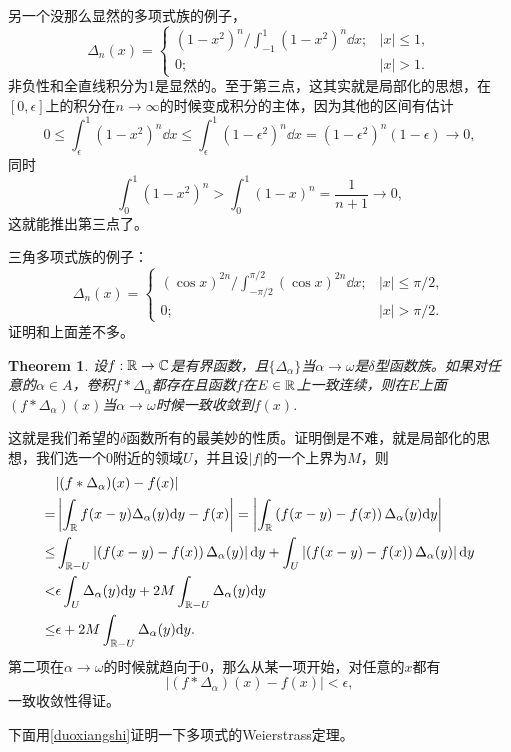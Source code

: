 \documentclass[10pt]{book}
\theoremstyle{plain}%
\newtheorem{theo}{Theorem}[chapter]%
\newcommand{\cc}{\mathbb{C}}
\begin{document}
另一个没那么显然的多项式族的例子，
\begin{equation}
\label{duoxiangshi}
	\Delta_n(x)=
	\begin{cases}
		\displaystyle{(1-x^2)^n\bigg/\int_{-1}^1(1-x^2)^n\dd x};&|x|\leq 1,\\
		0;&|x|> 1.
	\end{cases}
\end{equation}
非负性和全直线积分为1是显然的。至于第三点，这其实就是局部化的思想，在$[0,\epsilon]$上的积分在$n\to \infty$的时候变成积分的主体，因为其他的区间有估计
\[
0\leq \int_\epsilon^1 (1-x^2)^n\dd x\leq \int_\epsilon^1 (1-\epsilon^2)^n\dd x=(1-\epsilon^2)^n(1-\epsilon)\to 0,
\]
同时
\[
\int_0^1 (1-x^2)^n>\int_0^1 (1-x)^n=\frac{1}{n+1}\to 0,
\]
这就能推出第三点了。

三角多项式族的例子：
\[
	\Delta_n(x)=
	\begin{cases}
		\displaystyle{(\cos x)^{2n}\bigg/\int_{-\pi/2}^{\pi/2}(\cos x)^{2n}\dd x};&|x|\leq \pi/2,\\
		0;&|x|> \pi/2.
	\end{cases}
\]
证明和上面差不多。
\begin{theo}
设$f:\rr\to\cc$是有界函数，且$\{\Delta_\alpha\}$当$\alpha\to\omega$是$\delta$型函数族。如果对任意的$\alpha\in A$，卷积$f*\Delta_\alpha$都存在且函数$f$在$E\in \mathbb{R}$上一致连续，则在$E$上面$(f*\Delta_\alpha)(x)$当$\alpha\to\omega$时候一致收敛到$f(x)$.
\end{theo}
这就是我们希望的$\delta$函数所有的最美妙的性质。证明倒是不难，就是局部化的思想，我们选一个$0$附近的领域$U$，并且设$|f|$的一个上界为$M$，则
\[
\begin{split}
	&|(f*\Delta_\alpha)(x)-f(x)|\\
	=&\left|\int_{\mathbb{R}} f(x-y)\Delta_\alpha(y)\mathrm{d} y-f(x)\right|=\left|\int_{\mathbb{R}}\left(f(x-y)-f(x)\right)\Delta_\alpha(y)\mathrm{d} y\right|\\
	\leq&\int_{\mathbb{R}-U}\left|\left(f(x-y)-f(x)\right)\Delta_\alpha(y)\right|\mathrm{d} y+\int_{U}\left|\left(f(x-y)-f(x)\right)\Delta_\alpha(y)\right|\mathrm{d} y\\
	<&\epsilon \int_{U}\Delta_\alpha(y)\mathrm{d} y+2M\int_{\mathbb{R}-U}\Delta_\alpha(y)\mathrm{d} y\\
	\leq&\epsilon+2M\int_{\mathbb{R}-U}\Delta_\alpha(y)\mathrm{d} y.
	\end{split}
\]
第二项在$\alpha\to\omega$的时候就趋向于0，那么从某一项开始，对任意的$x$都有
\[
|(f*\Delta_\alpha)(x)-f(x)|<\epsilon,
\]
一致收敛性得证。

下面用\eqref{duoxiangshi}证明一下多项式的Weierstrass定理。
\end{document}
